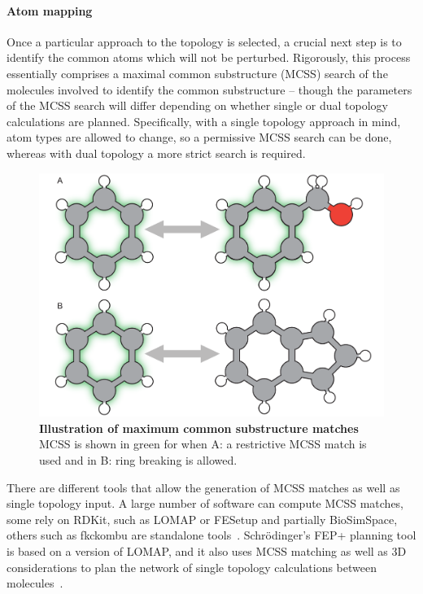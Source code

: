 \documentclass[9pt,bestpractices]{livecoms}
\begin{document}
\paragraph{Atom mapping}
Once a particular approach to the topology is selected, a crucial next step is to identify the common atoms which will not be perturbed.
Rigorously, this process essentially comprises a maximal common substructure (MCSS) search of the molecules involved to identify the common substructure -- though the parameters of the MCSS search will differ depending on whether single or dual topology calculations are planned.
Specifically, with a single topology approach in mind, atom types are allowed to change, so a permissive MCSS search can be done, whereas with dual topology a more strict search is required.
\begin{figure}[h!]
    \includegraphics[width=0.95\linewidth]{figures/fig4_mcs/Figure.pdf}
    \caption{\textbf{Illustration of maximum common substructure matches} MCSS is shown in green for when A: a restrictive MCSS match is used and in B: ring breaking is allowed.}
    \label{fig:fig_mcss}
\end{figure} 
%
There are different tools that allow the generation of MCSS matches as well as single topology input. A large number of software can compute MCSS matches, some rely on RDKit, such as LOMAP or FESetup and partially BioSimSpace, others such as fkckombu are standalone tools~\cite{rdkit2019Dec, loeffler2015fesetup, liu2013lead, hedges2019biosimspace, kawabata20143d}. Schr\"{o}dinger's FEP+ planning tool is based on a version of LOMAP, and it also uses MCSS matching as well as 3D considerations to plan the network of single topology calculations between molecules~\cite{wang2015accurate}. 
\end{document}
